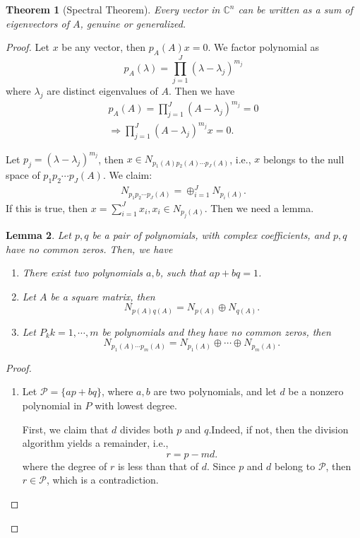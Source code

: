 \documentclass[11pt]{book}
\newtheorem{theorem}{Theorem}[section]
\newtheorem{lemma}[theorem]{Lemma}
\theoremstyle{definition}
\numberwithin{equation}{subsection}
\begin{document}
\begin{theorem}[Spectral Theorem]
Every vector in $\mathbb{C}^n$ can be written as a sum of eigenvectors of $A$, genuine or generalized.
\end{theorem}
\begin{proof}
Let $x$ be any vector, then $p_A(A)x = 0$. We factor polynomial as $$p_A(\lambda) = \prod^J_{j=1}\left(\lambda - \lambda_j\right)^{m_j}$$ where $\lambda_j$ are distinct eigenvalues of $A$. Then we have
\begin{align*}
    p_A(A) = \prod^J_{j=1}\left(A - \lambda_j\right)^{m_j} = 0 \\
    \Rightarrow \prod^J_{j=1}\left(A - \lambda_j\right)^{m_j}x = 0.
\end{align*}

Let $p_j = \left(\lambda - \lambda_j\right)^{m_j}$, then $x\in N_{p_1(A)p_2(A)\cdots p_J(A)}$, i.e., $x$ belongs to the null space of $p_1p_2\cdots p_J(A)$. We claim: 
\begin{align*}
    N_{p_1p_2\cdots p_J(A)} = \oplus^J_{i=1} N_{p_i(A)}.
\end{align*}
If this is true, then $x = \sum^J_{i=1}x_i, x_i\in N_{p_j(A)}$. Then we need a lemma.

\begin{lemma}
Let $p, q$ be a pair of polynomials, with complex coefficients, and $p,q$ have no common zeros. Then, we have
\begin{enumerate}[label=(\arabic*)]
    \item There exist two polynomials $a,b$, such that $ap+bq = 1$.
    \item Let $A$ be a square matrix, then 
    $$N_{p(A)q(A)} = N_{p(A)} \oplus N_{q(A)}.$$
    \item Let $P_k k = 1, \cdots, m$ be polynomials and they have no common zeros, then 
    $$N_{p_1(A)\cdots p_m(A)} = N_{p_1(A)} \oplus\cdots\oplus N_{p_m(A)}.$$
\end{enumerate}
\end{lemma}
\begin{proof}
~\begin{enumerate}[label=(\arabic*)]
    \item Let $\mathcal{P} = \{ap+bq\}$, where $a,b$ are two polynomials, and let $d$ be a nonzero polynomial in $P$ with lowest degree. 
    
    First, we claim that $d$ divides both $p$ and $q$.Indeed, if not, then the division algorithm yields a remainder, i.e.,
    $$r = p - md.$$
    where the degree of $r$ is less than that of $d$. Since $p$ and $d$ belong to $\mathcal{P}$, then $r\in \mathcal{P}$, which is a contradiction. 
    

\end{enumerate}
\end{proof}
\end{proof}
\end{document}
